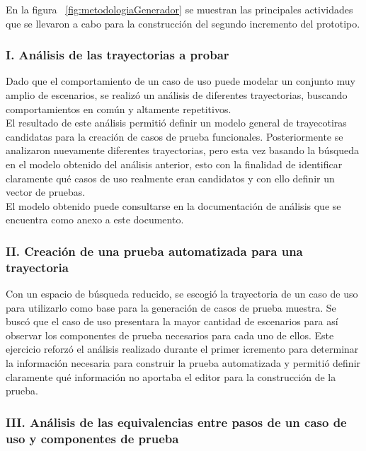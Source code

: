 	En la figura ~\ref{fig:metodologiaGenerador} se muestran las principales actividades que se llevaron a cabo para la construcción del segundo incremento del prototipo.
	
	
\subsubsection{I. Análisis de las trayectorias a probar}

	Dado que el comportamiento de un caso de uso puede modelar un conjunto muy amplio de escenarios, se realizó un análisis de diferentes trayectorias, buscando comportamientos en común y altamente repetitivos.\\
	
	El resultado de este análisis permitió definir un modelo general de trayecotiras candidatas para la creación de casos de prueba funcionales. Posteriormente se analizaron nuevamente diferentes trayectorias, pero esta vez basando la búsqueda en el modelo obtenido del análisis anterior, esto con la finalidad de identificar claramente qué casos de uso realmente eran candidatos y con ello definir un vector de pruebas.\\ El modelo obtenido puede consultarse en la documentación de análisis que se encuentra como anexo a este documento.
	
	
\subsubsection{II. Creación de una prueba automatizada para una trayectoria}

	Con un espacio de búsqueda reducido, se escogió la trayectoria de un caso de uso para utilizarlo como base para la generación de casos de prueba muestra. Se buscó que el caso de uso presentara la mayor cantidad de escenarios para así observar los componentes de prueba necesarios para cada uno de ellos. Este ejercicio reforzó el análisis realizado durante el primer icremento para determinar la información necesaria para construir la prueba automatizada y permitió definir claramente qué información no aportaba el editor para la construcción de la prueba.
	
\subsubsection{III. Análisis de las equivalencias entre pasos de un caso de uso y componentes de  prueba}


